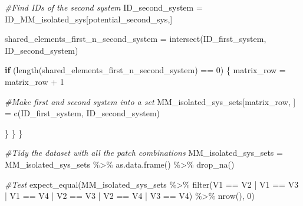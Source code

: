 \documentclass[
]{article}
\newenvironment{Shaded}{\begin{snugshade}}{\end{snugshade}}
\newcommand{\CommentTok}[1]{\textcolor[rgb]{0.56,0.35,0.01}{\textit{#1}}}
\newcommand{\ControlFlowTok}[1]{\textcolor[rgb]{0.13,0.29,0.53}{\textbf{#1}}}
\newcommand{\DecValTok}[1]{\textcolor[rgb]{0.00,0.00,0.81}{#1}}
\newcommand{\FunctionTok}[1]{\textcolor[rgb]{0.00,0.00,0.00}{#1}}
\newcommand{\NormalTok}[1]{#1}
\newcommand{\OtherTok}[1]{\textcolor[rgb]{0.56,0.35,0.01}{#1}}
\newcommand{\SpecialCharTok}[1]{\textcolor[rgb]{0.00,0.00,0.00}{#1}}
\begin{document}
\begin{Shaded}
\begin{Highlighting}[]
      \CommentTok{\#Find IDs of the second system }
\NormalTok{      ID\_second\_system }\OtherTok{=}\NormalTok{ ID\_MM\_isolated\_sys[potential\_second\_sys,]}
      
\NormalTok{      shared\_elements\_first\_n\_second\_system }\OtherTok{=} \FunctionTok{intersect}\NormalTok{(ID\_first\_system, }
\NormalTok{                                                        ID\_second\_system)}
      
      \ControlFlowTok{if}\NormalTok{ (}\FunctionTok{length}\NormalTok{(shared\_elements\_first\_n\_second\_system) }\SpecialCharTok{==} \DecValTok{0}\NormalTok{) \{}
\NormalTok{        matrix\_row }\OtherTok{=}\NormalTok{ matrix\_row }\SpecialCharTok{+} \DecValTok{1}

        \CommentTok{\#Make first and second system into a set }
\NormalTok{        MM\_isolated\_sys\_sets[matrix\_row, ] }\OtherTok{=} \FunctionTok{c}\NormalTok{(ID\_first\_system,}
\NormalTok{                                               ID\_second\_system)}
        
\NormalTok{      \}}
\NormalTok{    \}}
\NormalTok{  \}}
  
  \CommentTok{\#Tidy the dataset with all the patch combinations }
\NormalTok{  MM\_isolated\_sys\_sets }\OtherTok{=}\NormalTok{ MM\_isolated\_sys\_sets }\SpecialCharTok{\%\textgreater{}\%} 
    \FunctionTok{as.data.frame}\NormalTok{() }\SpecialCharTok{\%\textgreater{}\%} 
    \FunctionTok{drop\_na}\NormalTok{()}
  
  \CommentTok{\#Test }
  \FunctionTok{expect\_equal}\NormalTok{(MM\_isolated\_sys\_sets }\SpecialCharTok{\%\textgreater{}\%} \FunctionTok{filter}\NormalTok{(V1 }\SpecialCharTok{==}\NormalTok{ V2 }\SpecialCharTok{|}\NormalTok{ V1 }\SpecialCharTok{==}\NormalTok{ V3 }\SpecialCharTok{|}\NormalTok{ V1 }\SpecialCharTok{==}\NormalTok{ V4 }\SpecialCharTok{|}\NormalTok{ V2 }\SpecialCharTok{==}\NormalTok{ V3 }\SpecialCharTok{|}\NormalTok{ V2 }\SpecialCharTok{==}\NormalTok{ V4 }\SpecialCharTok{|}\NormalTok{ V3 }\SpecialCharTok{==}\NormalTok{ V4) }\SpecialCharTok{\%\textgreater{}\%} \FunctionTok{nrow}\NormalTok{(),}
               \DecValTok{0}\NormalTok{)}
  

\end{Highlighting}
\end{Shaded}
\end{document}
